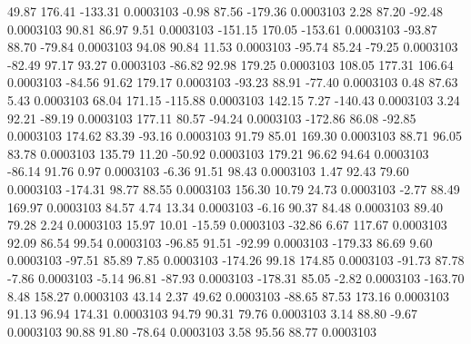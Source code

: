        49.87      176.41     -133.31     0.0003103
       -0.98       87.56     -179.36     0.0003103
        2.28       87.20      -92.48     0.0003103
       90.81       86.97        9.51     0.0003103
     -151.15      170.05     -153.61     0.0003103
      -93.87       88.70      -79.84     0.0003103
       94.08       90.84       11.53     0.0003103
      -95.74       85.24      -79.25     0.0003103
      -82.49       97.17       93.27     0.0003103
      -86.82       92.98      179.25     0.0003103
      108.05      177.31      106.64     0.0003103
      -84.56       91.62      179.17     0.0003103
      -93.23       88.91      -77.40     0.0003103
        0.48       87.63        5.43     0.0003103
       68.04      171.15     -115.88     0.0003103
      142.15        7.27     -140.43     0.0003103
        3.24       92.21      -89.19     0.0003103
      177.11       80.57      -94.24     0.0003103
     -172.86       86.08      -92.85     0.0003103
      174.62       83.39      -93.16     0.0003103
       91.79       85.01      169.30     0.0003103
       88.71       96.05       83.78     0.0003103
      135.79       11.20      -50.92     0.0003103
      179.21       96.62       94.64     0.0003103
      -86.14       91.76        0.97     0.0003103
       -6.36       91.51       98.43     0.0003103
        1.47       92.43       79.60     0.0003103
     -174.31       98.77       88.55     0.0003103
      156.30       10.79       24.73     0.0003103
       -2.77       88.49      169.97     0.0003103
       84.57        4.74       13.34     0.0003103
       -6.16       90.37       84.48     0.0003103
       89.40       79.28        2.24     0.0003103
       15.97       10.01      -15.59     0.0003103
      -32.86        6.67      117.67     0.0003103
       92.09       86.54       99.54     0.0003103
      -96.85       91.51      -92.99     0.0003103
     -179.33       86.69        9.60     0.0003103
      -97.51       85.89        7.85     0.0003103
     -174.26       99.18      174.85     0.0003103
      -91.73       87.78       -7.86     0.0003103
       -5.14       96.81      -87.93     0.0003103
     -178.31       85.05       -2.82     0.0003103
     -163.70        8.48      158.27     0.0003103
       43.14        2.37       49.62     0.0003103
      -88.65       87.53      173.16     0.0003103
       91.13       96.94      174.31     0.0003103
       94.79       90.31       79.76     0.0003103
        3.14       88.80       -9.67     0.0003103
       90.88       91.80      -78.64     0.0003103
        3.58       95.56       88.77     0.0003103

